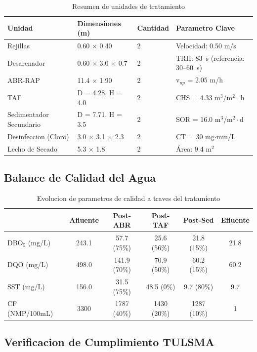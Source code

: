 \documentclass[12pt,a4paper]{article}
\begin{document}
\begin{table}[H]
\centering
\caption{Resumen de unidades de tratamiento}
\small
\begin{tabular}{p{3.2cm}p{3.5cm}p{1.5cm}p{4.8cm}}
\toprule
\textbf{Unidad} & \textbf{Dimensiones (m)} & \textbf{Cantidad} & \textbf{Parametro Clave} \\
\midrule
Rejillas & 0.60 $\times$ 0.40 & 2 & Velocidad: 0.50 m/s \\
Desarenador & 0.60 $\times$ 3.0 $\times$ 0.7 & 2 & TRH: 83~s (referencia: 30--60~s) \\
ABR-RAP & 11.4 $\times$ 1.90 & 2 & v$_{up}$ = 2.05 m/h \\
TAF & D = 4.28, H = 4.0 & 2 & CHS = 4.33 m$^3$/m$^2$·h \\
Sedimentador Secundario & D = 7.71, H = 3.5 & 2 & SOR = 16.0 m$^3$/m$^2\cdot$d \\
Desinfeccion (Cloro) & 3.0 $\times$ 3.1 $\times$ 2.3 & 2 & CT = 30 mg$\cdot$min/L \\
Lecho de Secado & 5.3 $\times$ 1.8 & 2 & Área: 9.4 m$^2$ \\
\bottomrule
\end{tabular}
\end{table}

\subsection{Balance de Calidad del Agua}

\begin{table}[H]
\centering
\caption{Evolucion de parametros de calidad a traves del tratamiento}
\begin{tabular}{lccccc}
\toprule
\textbf{} & \textbf{Afluente} & \textbf{Post-ABR} & \textbf{Post-TAF} & \textbf{Post-Sed} & \textbf{Efluente} \\
\midrule
DBO$_5$ (mg/L) & 243.1 & 57.7 (75\%) & 25.6 (56\%) & 21.8 (15\%) & 21.8 \\
DQO (mg/L) & 498.0 & 141.9 (70\%) & 70.9 (50\%) & 60.2 (15\%) & 60.2 \\
SST (mg/L) & 156.0 & 31.5 (75\%) & 48.5 (0\%) & 9.7 (80\%) & 9.7 \\
CF (NMP/100mL) & 3300 & 1787 (40\%) & 1430 (20\%) & 1287 (10\%) & 1 \\
\bottomrule
\end{tabular}
\end{table}

\subsection{Verificacion de Cumplimiento TULSMA}
\end{document}
